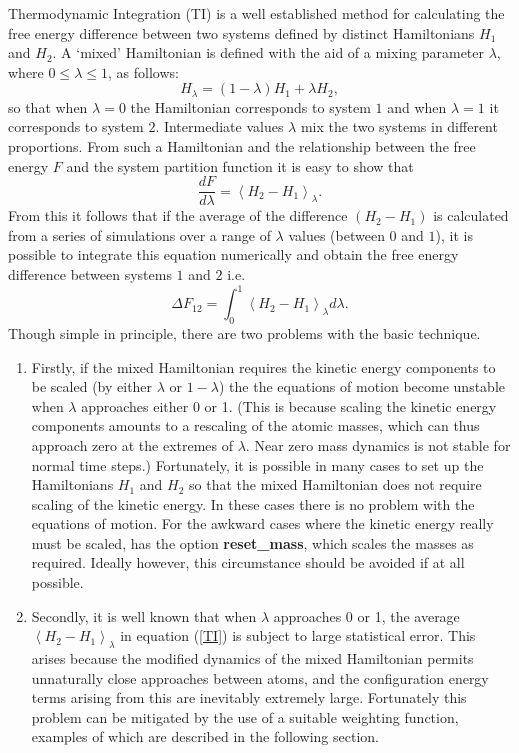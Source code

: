 Thermodynamic Integration (TI) is a well established method for calculating
the free energy difference between two systems defined by distinct
Hamiltonians $H_{1}$ and $H_{2}$. A `mixed' Hamiltonian is defined with the
aid of a mixing parameter $\lambda$, where $0\le\lambda\le 1$, as follows:
\begin{equation}
H_{\lambda}=(1-\lambda)H_{1}+\lambda H_{2}, \label{mixed1}
\end{equation}
so that when $\lambda = 0$ the Hamiltonian corresponds to system $1$ and when
$\lambda = 1$ it corresponds to system $2$. Intermediate values $\lambda$ mix
the two systems in different proportions. From such a Hamiltonian and the
relationship between the free energy $F$ and the system partition function it
is easy to show that
\begin{equation}
\frac{d F}{d \lambda}  = \left  <H_{2}-H_{1}\right >_{\lambda}. 
\end{equation}
From this it follows that if the average of the difference $(H_{2}-H_{1})$ is
calculated from a series of simulations over a range of $\lambda$ values
(between $0$ and $1$), it is possible to integrate this equation numerically
and obtain the free energy difference between systems $1$ and $2$ i.e.
\begin{equation}
\Delta F_{12}=\int_{0}^{1}\left  <H_{2}-H_{1}\right >_{\lambda} d\lambda. \label{TI}
\end{equation}
Though simple in principle, there are two problems with the basic technique.
\begin{enumerate}
\item Firstly, if the mixed Hamiltonian requires the kinetic energy components
  to be scaled (by either $\lambda$ or $1-\lambda$) the the equations of
  motion become unstable when $\lambda$ approaches either 0 or 1. (This is
  because scaling the kinetic energy components amounts to a rescaling of the
  atomic masses, which can thus approach zero at the extremes of $\lambda$.
  Near zero mass dynamics is not stable for normal time steps.)  Fortunately,
  it is possible in many cases to set up the Hamiltonians $H_{1}$ and $H_{2}$
  so that the mixed Hamiltonian does not require scaling of the kinetic energy.
  In these cases there is no problem with the equations of motion. For the
  awkward cases where the kinetic energy really must be scaled, \D{} has the
  option {\bf reset\_mass}, which scales the masses as required. Ideally
  however, this circumstance should be avoided if at all possible.
\item Secondly, it is well known that when $\lambda$ approaches 0 or 1, the
  average $\left <H_{2}-H_{1}\right >_{\lambda}$ in equation (\ref{TI}) is
  subject to large statistical error. This arises because the modified
  dynamics of the mixed Hamiltonian permits unnaturally close approaches
  between atoms, and the configuration energy terms arising from this are
  inevitably extremely large. Fortunately this problem can be mitigated by the
  use of a suitable weighting function, examples of which are described in the
  following section.
\end{enumerate}
